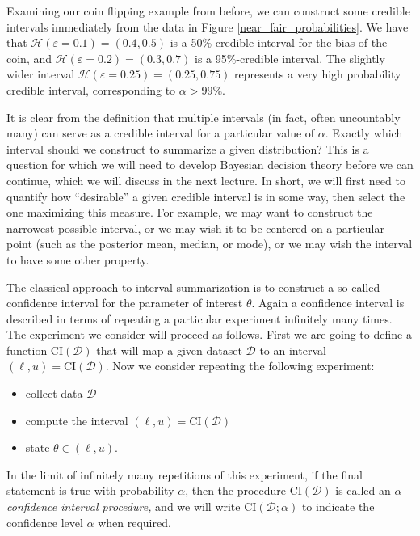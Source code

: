 \documentclass{article}
\newcommand{\mc}[1]{\mathcal{#1}}
\newcommand{\data}{\mc{D}}
\newcommand{\ci}{\text{CI}}
\begin{document}
Examining our coin flipping example from before, we can construct some credible
intervals immediately from the data in Figure \ref{near_fair_probabilities}.  We
have that $\mathcal{H}(\varepsilon = 0.1) = (0.4, 0.5)$ is a 50\%-credible
interval for the bias of the coin, and $\mathcal{H}(\varepsilon = 0.2) = (0.3,
0.7)$ is a 95\%-credible interval. The slightly wider interval
$\mathcal{H}(\varepsilon = 0.25) = (0.25, 0.75)$ represents a very high
probability credible interval, corresponding to $\alpha > 99\%$.

It is clear from the definition that multiple intervals (in fact, often
uncountably many) can serve as a credible interval for a particular value of
$\alpha$. Exactly which interval should we construct to summarize a given
distribution? This is a question for which we will need to develop Bayesian
decision theory before we can continue, which we will discuss in the next
lecture. In short, we will first need to quantify how ``desirable'' a given
credible interval is in some way, then select the one maximizing this measure.
For example, we may want to construct the narrowest possible interval, or we may
wish it to be centered on a particular point (such as the posterior mean,
median, or mode), or we may wish the interval to have some other property.

The classical approach to interval summarization is to construct a so-called
confidence interval for the parameter of interest $\theta$. Again a confidence
interval is described in terms of repeating a particular experiment infinitely
many times. The experiment we consider will proceed as follows. First we are
going to define a function $\ci(\data)$ that will map a given dataset $\data$ to
an interval $(\ell, u) = \ci(\data)$. Now we consider repeating the following
experiment:
\begin{itemize}
\item
  collect data $\data$
\item
  compute the interval $(\ell, u) = \ci(\data)$
\item
  state $\theta \in (\ell, u)$.
\end{itemize}
In the limit of infinitely many repetitions of this experiment, if the final
statement is true with probability $\alpha$, then the procedure $\ci(\data)$ is
called an $\alpha$\emph{-confidence interval procedure,} and we will write
$\ci(\data; \alpha)$ to indicate the confidence level $\alpha$ when required.
\end{document}
